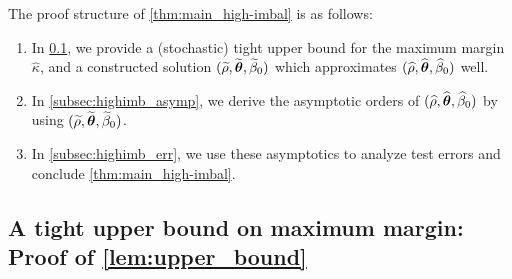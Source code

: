 The proof structure of \cref{thm:main_high-imbal} is as follows:
\begin{enumerate}
    \item In \cref{subsec:highimb_upper}, we provide a (stochastic) tight upper bound for the maximum margin $\hat\kappa$, and a constructed solution $(\widetilde\rho, \widetilde{{\boldsymbol{\theta}}}, \widetilde\beta_0)$ which approximates $(\widehat\rho, \widehat{{\boldsymbol{\theta}}}, \widehat\beta_0)$ well.
    \item In \cref{subsec:highimb_asymp}, we derive the asymptotic orders of $(\widehat\rho, \widehat{{\boldsymbol{\theta}}}, \widehat\beta_0)$ by using $(\widetilde\rho, \widetilde{{\boldsymbol{\theta}}}, \widetilde\beta_0)$.
    \item In \cref{subsec:highimb_err}, we use these asymptotics to analyze test errors and conclude \cref{thm:main_high-imbal}.
\end{enumerate}




\subsection{A tight upper bound on maximum margin: Proof of \cref{lem:upper_bound}}
\label{subsec:highimb_upper}


